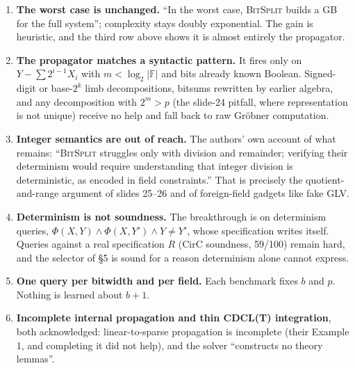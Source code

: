 \documentclass[10pt]{article}
\newcommand{\F}{\mathbb F}\newcommand{\wb}{\overline w}
\newcommand{\sect}[1]{\par\vspace{4pt}{\large\bfseries #1}\par\nobreak\vspace{1pt}}
\begin{document}
\sect{10. What it does not fix}
\begin{enumerate}[leftmargin=1.3em,itemsep=1pt,topsep=1pt]
\item \textbf{The worst case is unchanged.} ``In the worst case, \textsc{BitSplit} builds a GB for the full system''; complexity stays
doubly exponential. The gain is heuristic, and the third row above shows it is almost entirely the propagator.
\item \textbf{The propagator matches a syntactic pattern.} It fires only on $Y-\sum 2^{i-1}X_i$ with $m<\log_2|\F|$ and bits already
known Boolean. Signed-digit or base-$2^k$ limb decompositions, bitsums rewritten by earlier algebra, and any decomposition with
$2^m>p$ (the slide-24 pitfall, where representation is not unique) receive no help and fall back to raw Gr\"obner computation.
\item \textbf{Integer semantics are out of reach.} The authors' own account of what remains: ``\textsc{BitSplit} struggles only with
division and remainder; verifying their determinism would require understanding that integer division is deterministic, as encoded
in field constraints.'' That is precisely the quotient-and-range argument of slides 25--26 and of foreign-field gadgets like fake GLV.
\item \textbf{Determinism is not soundness.} The breakthrough is on determinism queries, $\Phi(X,Y)\wedge\Phi(X,Y')\wedge Y\ne Y'$,
whose specification writes itself. Queries against a real specification $R$ (CirC soundness, 59/100) remain hard, and the
selector of \S5 is sound for a reason determinism alone cannot express.
\item \textbf{One query per bitwidth and per field.} Each benchmark fixes $b$ and $p$. Nothing is learned about $b+1$.
\item \textbf{Incomplete internal propagation and thin CDCL(T) integration}, both acknowledged: linear-to-sparse propagation is
incomplete (their Example 1, and completing it did not help), and the solver ``constructs no theory lemmas''.
\end{enumerate}
\end{document}
